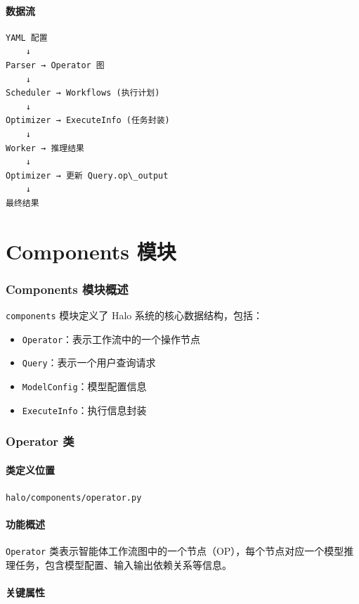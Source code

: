 \documentclass[12pt,a4paper]{article}
\begin{document}
\subsection{数据流}

\begin{verbatim}
YAML 配置
    ↓
Parser → Operator 图
    ↓
Scheduler → Workflows (执行计划)
    ↓
Optimizer → ExecuteInfo (任务封装)
    ↓
Worker → 推理结果
    ↓
Optimizer → 更新 Query.op\_output
    ↓
最终结果
\end{verbatim}

\part{Components 模块}

\section{Components 模块概述}

\texttt{components} 模块定义了 Halo 系统的核心数据结构，包括：
\begin{itemize}
    \item \texttt{Operator}：表示工作流中的一个操作节点
    \item \texttt{Query}：表示一个用户查询请求
    \item \texttt{ModelConfig}：模型配置信息
    \item \texttt{ExecuteInfo}：执行信息封装
\end{itemize}

\section{Operator 类}

\subsection{类定义位置}
\texttt{halo/components/operator.py}

\subsection{功能概述}
\texttt{Operator} 类表示智能体工作流图中的一个节点（OP），每个节点对应一个模型推理任务，包含模型配置、输入输出依赖关系等信息。

\subsection{关键属性}
\end{document}
